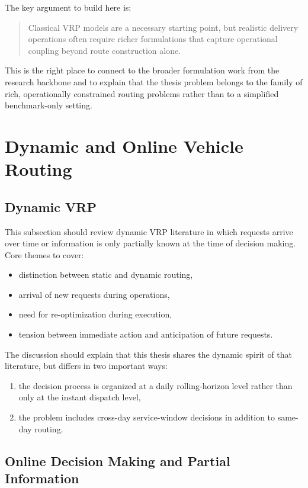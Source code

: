 The key argument to build here is:

\begin{quote}
Classical VRP models are a necessary starting point, but realistic delivery operations often require richer formulations that capture operational coupling beyond route construction alone.
\end{quote}

This is the right place to connect to the broader formulation work from the research backbone and to explain that the thesis problem belongs to the family of rich, operationally constrained routing problems rather than to a simplified benchmark-only setting.

\section{Dynamic and Online Vehicle Routing}

\subsection{Dynamic VRP}

This subsection should review dynamic VRP literature in which requests arrive over time or information is only partially known at the time of decision making. Core themes to cover:

\begin{itemize}
    \item distinction between static and dynamic routing,
    \item arrival of new requests during operations,
    \item need for re-optimization during execution,
    \item tension between immediate action and anticipation of future requests.
\end{itemize}

The discussion should explain that this thesis shares the dynamic spirit of that literature, but differs in two important ways:

\begin{enumerate}
    \item the decision process is organized at a daily rolling-horizon level rather than only at the instant dispatch level,
    \item the problem includes cross-day service-window decisions in addition to same-day routing.
\end{enumerate}

\subsection{Online Decision Making and Partial Information}

